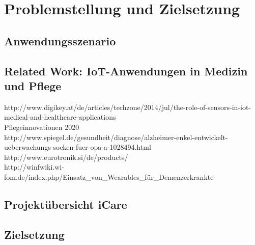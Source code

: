\section{Problemstellung und Zielsetzung}\label{sec:definitionen}

\subsection{Anwendungsszenario}

\subsection{Related Work: IoT-Anwendungen in Medizin und Pflege}\label{ssec:rel.work}
http://www.digikey.at/de/articles/techzone/2014/jul/the-role-of-sensors-in-iot-medical-and-healthcare-applications\\
Pflegeinnovationen 2020\\
http://www.spiegel.de/gesundheit/diagnose/alzheimer-enkel-entwickelt-ueberwachungs-socken-fuer-opa-a-1028494.html\\
http://www.eurotronik.si/de/products/\\
http://winfwiki.wi-fom.de/index.php/Einsatz\_von\_Wearables\_für\_Demenzerkrankte\\



\subsection{Projektübersicht iCare}

\subsection{Zielsetzung}

